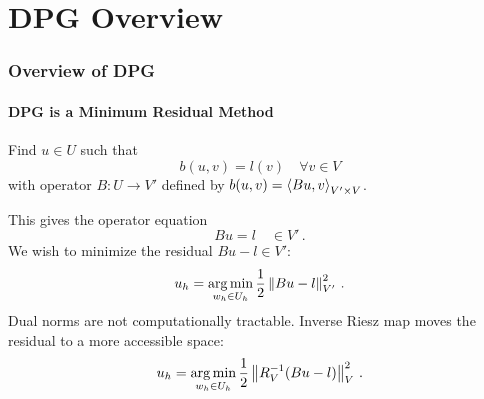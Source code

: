 \documentclass[18pt,xcolor=table]{beamer}
\begin{document}
%                                                                                                                      
%                                                                                                                      
% 
\section{DPG Overview}
\begin{frame}[t]
\frametitle{Overview of DPG}
\framesubtitle{DPG is a Minimum Residual Method}
Find $u\in U$ such that
\[
b(u,v)=l(v)\quad\forall v\in V
\]
with operator $B:U\rightarrow V'$ defined by $b(u,v)=\left\langle Bu,v \right\rangle_{V'\times V}$.

This gives the operator equation 
\[
Bu=l\quad\in V'\,.
\]
We wish to minimize the residual $Bu-l\in V'$:
\[
u_h=\operatorname*{arg\,min}_{w_h\in U_h}\frac{1}{2}\left\| Bu-l \right\|^2_{V'}\,.
\]
Dual norms are not computationally tractable. 
Inverse Riesz map moves the residual to a more accessible space:
\[
u_h=\operatorname*{arg\,min}_{w_h\in U_h}\frac{1}{2}\left\| R_V^{-1}(Bu-l) \right\|^2_{V}\,.
\]
\end{frame}
\end{document}
